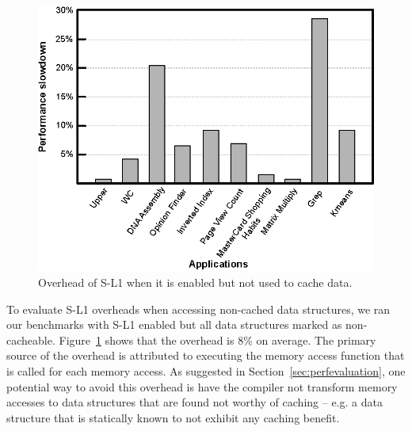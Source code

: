 \begin{figure}[t]
\center
\includegraphics[scale=0.82]{7cachingOverhead.eps}
\vspace{-0.3cm}
\caption{\footnotesize\textnormal{Overhead of S-L1 when it is enabled but not used to cache data.}}
\label{fig:sl1overhead}
\vspace{-0.3cm}
\end{figure}



To evaluate S-L1 overheads when accessing non-cached data structures, we ran our benchmarks with S-L1 enabled but all
data structures marked as non-cacheable. Figure~\ref{fig:sl1overhead} shows that the overhead is 8\% on average.
The primary source of the overhead is attributed to executing the memory access function that is called for each memory access.
As suggested in Section~\ref{sec:perfevaluation}, one potential way to avoid this overhead is have the compiler not
transform memory accesses to data structures that are found not worthy of caching -- e.g. a data
structure that is statically known to not exhibit any caching benefit.



